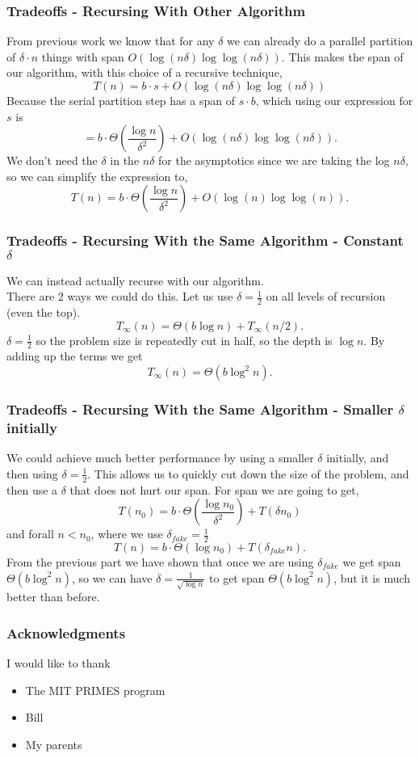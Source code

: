 \documentclass{beamer}
\begin{document}
\begin{frame}
\frametitle{Tradeoffs - Recursing With Other Algorithm}

From previous work we know that for any $\delta$ we can already do a parallel partition of $\delta \cdot n$ things with span $O(\log(n\delta)\log\log(n\delta)).$ This makes the span of our algorithm, with this choice of a recursive technique, 
$$T(n) = b\cdot s + O(\log(n\delta)\log\log(n\delta))$$ 
Because the serial partition step has a span of $s\cdot b$, which using our expression for $s$ is
$$= b\cdot \Theta(\frac{\log n}{\delta ^2})+O(\log(n\delta)\log\log(n\delta)).$$
We don't need the $\delta$ in the $n\delta$ for the asymptotics since we are taking the log $n\delta$, so we can simplify the expression to,
$$T(n) = b\cdot \Theta(\frac{\log n}{\delta ^2})+O(\log(n)\log\log(n)).$$

\end{frame}
\begin{frame}
\frametitle{Tradeoffs - Recursing With the Same Algorithm  - Constant $\delta$}
We can instead actually recurse with our algorithm. \\
There are 2 ways we could do this. 
Let us use $\delta = \frac{1}{2}$ on all levels of recursion (even the top).
$$T_{\infty}(n) = \Theta(b\log n)+T_{\infty}(n/2).$$
$\delta = \frac{1}{2}$ so the problem size is repeatedly cut in half, so the depth is $\log n$. By adding up the terms we get $$T_{\infty}(n) = \Theta(b\log^2 n).$$
\end{frame}

\begin{frame}
\frametitle{Tradeoffs - Recursing With the Same Algorithm  - Smaller $\delta$ initially}
We could achieve much better performance by using a smaller $\delta$ initially, and then using $\delta = \frac{1}{2}$. This allows us to quickly cut down the size of the problem, and then use a $\delta$ that does not hurt our span. For span we are going to get,
$$T(n_0) = b\cdot \Theta(\frac{\log n_0}{\delta ^2})+T(\delta n_0)$$
and forall $n<n_0$, where we use $\delta_{fake} = \frac{1}{2}$
$$T(n) =  b\cdot \Theta(\log n_0)+T(\delta_{fake} n).$$
From the previous part we have shown that once we are using $\delta_{fake}$ we get span $\Theta(b\log^2 n)$, so we can have $\delta = \frac{1}{\sqrt{\log n}}$ to get span $\Theta(b\log^2 n)$, but it is much better than before. 
\end{frame}

\begin{frame}
\frametitle{Acknowledgments}
I would like to thank
\begin{itemize}
	\item {The MIT PRIMES program}
	\item {Bill}
	\item {My parents}
\end{itemize}
\end{frame}
\end{document}
